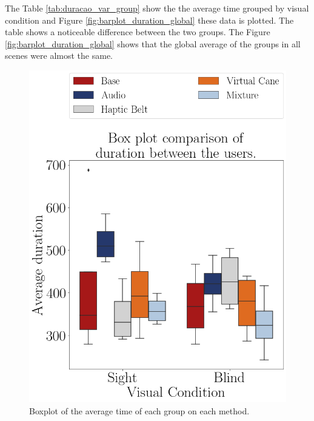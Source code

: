 

The Table \ref{tab:duracao_var_group} show the the average time grouped by visual condition and Figure \ref{fig:barplot_duration_global} these data is plotted. The table shows a noticeable difference between the two groups. The Figure \ref{fig:barplot_duration_global} shows that the global average of the groups in all scenes were almost the same.



\begin{figure}[!htb]
    \begin{minipage}{.45\linewidth}
        \centering
        \includegraphics[width = \linewidth]{Resultados/Tempo/Figuras/png/boxplot_duration_scene.png}
        \caption{Boxplot of the average time of each group on each method.}
        \label{fig:boxplot_duration_scene}

\end{minipage}
\end{figure}
